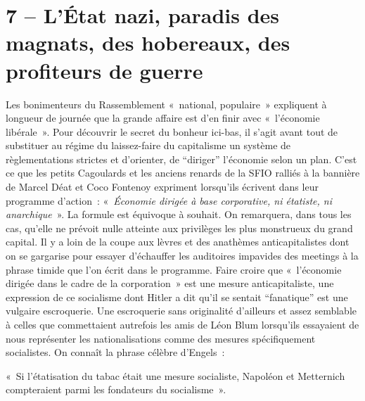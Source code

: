 \documentclass[french,twoside]{book} %
\newenvironment{quoteblock}%
  {\begin{quoting}}
  {\end{quoting}}
\newenvironment{quotebar}{%
    \def\FrameCommand{{\color{rubric!10!}\vrule width 0.5em} \hspace{0.9em}}%
    \def\OuterFrameSep{\itemsep} %
    \MakeFramed {\advance\hsize-\width \FrameRestore}
  }%
  {%
    \endMakeFramed
  }
\renewenvironment{quoteblock}%
  {%
    \savenotes
    \setstretch{0.9}
    \normalfont
    \begin{quotebar}
  }
  {%
    \end{quotebar}
    \spewnotes
  }
\begin{document}
\section[7 – L’État nazi, paradis des magnats, des hobereaux, des profiteurs de guerre]{7 – L’État nazi, paradis des magnats, des hobereaux, des profiteurs de guerre}
\noindent Les bonimenteurs du Rassemblement « national, populaire » expliquent à longueur de journée que la grande affaire est d’en finir avec « l’économie libérale ». Pour découvrir le secret du bonheur ici-bas, il s’agit avant tout de substituer au régime du laissez-faire du capitalisme un système de règlementations strictes et d’orienter, de “diriger” l’économie selon un plan. C’est ce que les petits Cagoulards et les anciens renards de la SFIO ralliés à la bannière de Marcel Déat et Coco Fontenoy expriment lorsqu’ils écrivent dans leur programme d’action : « \emph{Économie dirigée à base corporative, ni étatiste, ni anarchique} ». La formule est équivoque à souhait. On remarquera, dans tous les cas, qu’elle ne prévoit nulle atteinte aux privilèges les plus monstrueux du grand capital. Il y a loin de la coupe aux lèvres et des anathèmes anticapitalistes dont on se gargarise pour essayer d’échauffer les auditoires impavides des meetings à la phrase timide que l’on écrit dans le programme. Faire croire que « l’économie dirigée dans le cadre de la corporation » est une mesure anticapitaliste, une expression de ce socialisme dont Hitler a dit qu’il se sentait “fanatique” est une vulgaire escroquerie. Une escroquerie sans originalité d’ailleurs et assez semblable à celles que commettaient autrefois les amis de Léon Blum lorsqu’ils essayaient de nous représenter les nationalisations comme des mesures spécifiquement socialistes. On connaît la phrase célèbre d’Engels :\par

\begin{quoteblock}
 \noindent « Si l’étatisation du tabac était une mesure socialiste, Napoléon et Metternich compteraient parmi les fondateurs du socialisme ».
 \end{quoteblock}
\end{document}
